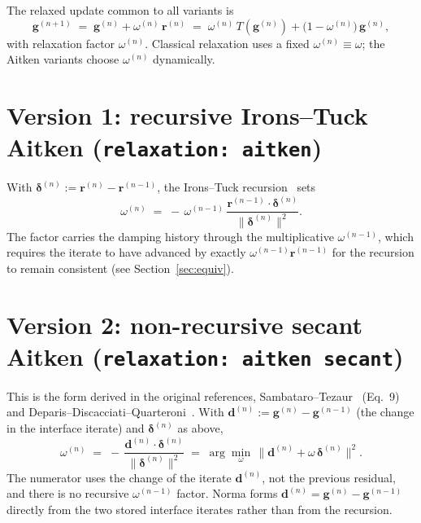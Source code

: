 \documentclass[11pt]{article}
\begin{document}
The relaxed update common to all variants is
\begin{equation}
    \bm{g}^{(n+1)} \;=\; \bm{g}^{(n)} + \omega^{(n)} \, \bm{r}^{(n)}
    \;=\; \omega^{(n)} \, T\!\left(\bm{g}^{(n)}\right)
        + \bigl(1 - \omega^{(n)}\bigr)\,\bm{g}^{(n)} ,
    \label{eq:update}
\end{equation}
with relaxation factor $\omega^{(n)}$. Classical relaxation uses a fixed
$\omega^{(n)} \equiv \omega$; the Aitken variants choose $\omega^{(n)}$
dynamically.

\section{Version 1: recursive Irons--Tuck Aitken (\texttt{relaxation: aitken})}

With $\bm{\delta}^{(n)} := \bm{r}^{(n)} - \bm{r}^{(n-1)}$, the Irons--Tuck
recursion~\cite{IronsTuck} sets
\begin{equation}
    \omega^{(n)} \;=\;
    -\,\omega^{(n-1)}\,
    \frac{\bm{r}^{(n-1)} \cdot \bm{\delta}^{(n)}}
         {\bigl\lVert \bm{\delta}^{(n)} \bigr\rVert^{2}} .
    \label{eq:ironstuck}
\end{equation}
The factor carries the damping history through the multiplicative
$\omega^{(n-1)}$, which requires the iterate to have advanced by exactly
$\omega^{(n-1)}\bm{r}^{(n-1)}$ for the recursion to remain consistent (see
Section~\ref{sec:equiv}).

\section{Version 2: non-recursive secant Aitken (\texttt{relaxation: aitken secant})}

This is the form derived in the original references,
Sambataro--Tezaur~\cite{SambataroTezaur} (Eq.~9) and
Deparis--Discacciati--Quarteroni~\cite{Deparis}. With
$\bm{d}^{(n)} := \bm{g}^{(n)} - \bm{g}^{(n-1)}$ (the change in the interface
iterate) and $\bm{\delta}^{(n)}$ as above,
\begin{equation}
    \omega^{(n)} \;=\;
    -\,\frac{\bm{d}^{(n)} \cdot \bm{\delta}^{(n)}}
            {\bigl\lVert \bm{\delta}^{(n)} \bigr\rVert^{2}}
    \;=\; \arg\min_{\omega}\,
          \bigl\lVert \bm{d}^{(n)} + \omega\,\bm{\delta}^{(n)} \bigr\rVert^{2} .
    \label{eq:secant}
\end{equation}
The numerator uses the change of the iterate $\bm{d}^{(n)}$, not the previous
residual, and there is no recursive $\omega^{(n-1)}$ factor. Norma forms
$\bm{d}^{(n)} = \bm{g}^{(n)} - \bm{g}^{(n-1)}$ directly from the two stored
interface iterates rather than from the recursion.
\end{document}
